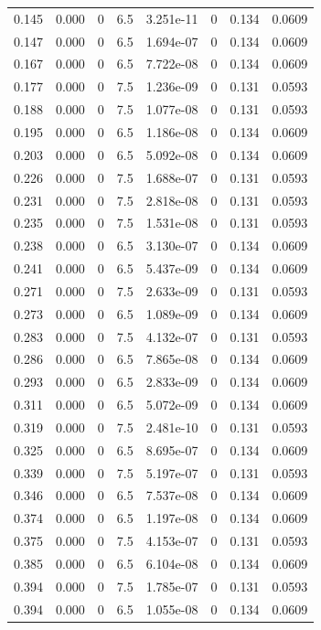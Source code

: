 \documentclass[preview]{standalone}
\begin{document}
{{\begin{tabular}{L{1.2cm}C{1.2cm} C{0.3cm}C{0.5cm} C{1.4cm}C{1.4cm} C{1.4cm}C{1.4cm}}
  0.145  &  0.000  & 0     & 6.5 &  3.251e-11  & 0  & 0.134 &  0.0609   \\ 
  0.147  &  0.000  & 0     & 6.5 &  1.694e-07  & 0  & 0.134 &  0.0609   \\ 
  0.167  &  0.000  & 0     & 6.5 &  7.722e-08  & 0  & 0.134 &  0.0609   \\ 
  0.177  &  0.000  & 0     & 7.5 &  1.236e-09  & 0  & 0.131 &  0.0593   \\ 
  0.188  &  0.000  & 0     & 7.5 &  1.077e-08  & 0  & 0.131 &  0.0593   \\ 
  0.195  &  0.000  & 0     & 6.5 &  1.186e-08  & 0  & 0.134 &  0.0609   \\ 
  0.203  &  0.000  & 0     & 6.5 &  5.092e-08  & 0  & 0.134 &  0.0609   \\ 
  0.226  &  0.000  & 0     & 7.5 &  1.688e-07  & 0  & 0.131 &  0.0593   \\ 
  0.231  &  0.000  & 0     & 7.5 &  2.818e-08  & 0  & 0.131 &  0.0593   \\ 
  0.235  &  0.000  & 0     & 7.5 &  1.531e-08  & 0  & 0.131 &  0.0593   \\ 
  0.238  &  0.000  & 0     & 6.5 &  3.130e-07  & 0  & 0.134 &  0.0609   \\ 
  0.241  &  0.000  & 0     & 6.5 &  5.437e-09  & 0  & 0.134 &  0.0609   \\ 
  0.271  &  0.000  & 0     & 7.5 &  2.633e-09  & 0  & 0.131 &  0.0593   \\ 
  0.273  &  0.000  & 0     & 6.5 &  1.089e-09  & 0  & 0.134 &  0.0609   \\ 
  0.283  &  0.000  & 0     & 7.5 &  4.132e-07  & 0  & 0.131 &  0.0593   \\ 
  0.286  &  0.000  & 0     & 6.5 &  7.865e-08  & 0  & 0.134 &  0.0609   \\ 
  0.293  &  0.000  & 0     & 6.5 &  2.833e-09  & 0  & 0.134 &  0.0609   \\ 
  0.311  &  0.000  & 0     & 6.5 &  5.072e-09  & 0  & 0.134 &  0.0609   \\ 
  0.319  &  0.000  & 0     & 7.5 &  2.481e-10  & 0  & 0.131 &  0.0593   \\ 
  0.325  &  0.000  & 0     & 6.5 &  8.695e-07  & 0  & 0.134 &  0.0609   \\ 
  0.339  &  0.000  & 0     & 7.5 &  5.197e-07  & 0  & 0.131 &  0.0593   \\ 
  0.346  &  0.000  & 0     & 6.5 &  7.537e-08  & 0  & 0.134 &  0.0609   \\ 
  0.374  &  0.000  & 0     & 6.5 &  1.197e-08  & 0  & 0.134 &  0.0609   \\ 
  0.375  &  0.000  & 0     & 7.5 &  4.153e-07  & 0  & 0.131 &  0.0593   \\ 
  0.385  &  0.000  & 0     & 6.5 &  6.104e-08  & 0  & 0.134 &  0.0609   \\ 
  0.394  &  0.000  & 0     & 7.5 &  1.785e-07  & 0  & 0.131 &  0.0593   \\ 
  0.394  &  0.000  & 0     & 6.5 &  1.055e-08  & 0  & 0.134 &  0.0609   \\ 
\hline 
\end{tabular} 

}}
\end{document}
